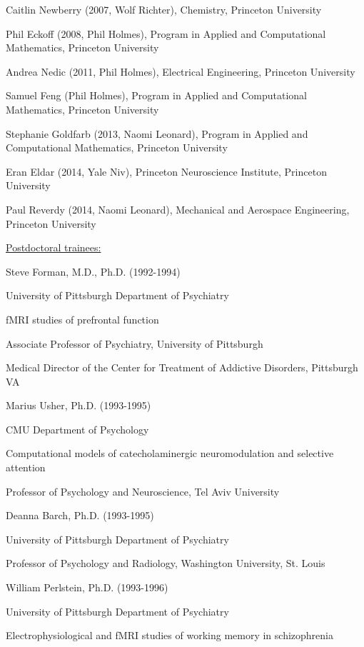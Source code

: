 \documentclass[10 pt]{article}
\begin{document}
Caitlin Newberry (2007, Wolf Richter), Chemistry, Princeton University
    \smallskip

Phil Eckoff (2008, Phil Holmes), Program in Applied and Computational Mathematics, Princeton University

Andrea Nedic (2011, Phil Holmes), Electrical Engineering, Princeton University
    \smallskip

Samuel Feng (Phil Holmes), Program in Applied and Computational Mathematics, Princeton University
    \smallskip

Stephanie Goldfarb (2013, Naomi Leonard), Program in Applied and Computational Mathematics, Princeton University
    \smallskip

Eran Eldar (2014, Yale Niv), Princeton Neuroscience Institute, Princeton University
    \smallskip

Paul Reverdy (2014, Naomi Leonard), Mechanical and Aerospace Engineering, Princeton University
    \bigskip


{\fontsize{13pt}{16 pt}\selectfont \underline{Postdoctoral trainees:}}
    \smallskip

Steve Forman, M.D., Ph.D. (1992-1994)

University of Pittsburgh Department of Psychiatry

fMRI studies of prefrontal function

Associate Professor of Psychiatry, University of Pittsburgh

Medical Director of the Center for Treatment of Addictive Disorders, Pittsburgh VA
    \medskip

Marius Usher, Ph.D. (1993-1995)

CMU Department of Psychology

Computational models of catecholaminergic neuromodulation and selective attention

Professor of Psychology and Neuroscience, Tel Aviv University
    \medskip

Deanna Barch, Ph.D. (1993-1995)

University of Pittsburgh Department of Psychiatry

Professor of Psychology and Radiology, Washington University, St. Louis
    \medskip

William Perlstein, Ph.D. (1993-1996)

University of Pittsburgh Department of Psychiatry

Electrophysiological and fMRI studies of working memory in schizophrenia
\end{document}
